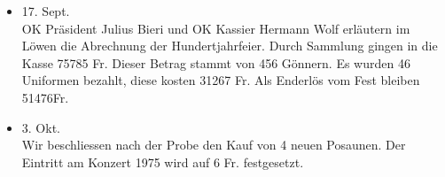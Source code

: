 \begin{multicols}{2}
\begin{itemize}
        \item[]17. Sept.\\
        OK Präsident Julius Bieri und OK Kassier Hermann Wolf erläutern im Löwen die Abrechnung der Hundertjahrfeier.
        Durch Sammlung gingen in die Kasse 75785 Fr. Dieser Betrag stammt von 456 Gönnern.
        Es wurden 46 Uniformen bezahlt, diese kosten 31267 Fr.
        Als Enderlös vom Fest bleiben 51476Fr.

        \item[]3. Okt.\\
        Wir beschliessen nach der Probe den Kauf von 4 neuen Posaunen. Der Eintritt am Konzert 1975 wird auf 6 Fr.
        festgesetzt.

    \end{itemize}

\end{multicols}
